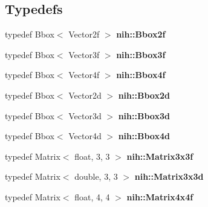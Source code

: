 \subsection*{\-Typedefs}
\begin{DoxyCompactItemize}
\item 
\hypertarget{group__linalg_ga5ebd3a6c3e9a5a8ac883e5a87bf821e6}{
typedef \-Bbox$<$ \-Vector2f $>$ {\bfseries nih\-::\-Bbox2f}}
\label{group__linalg_ga5ebd3a6c3e9a5a8ac883e5a87bf821e6}

\item 
\hypertarget{group__linalg_ga4454301371a3ef18876d4c33f9b15418}{
typedef \-Bbox$<$ \-Vector3f $>$ {\bfseries nih\-::\-Bbox3f}}
\label{group__linalg_ga4454301371a3ef18876d4c33f9b15418}

\item 
\hypertarget{group__linalg_ga276df7c674fca6914e123dcf4df166ed}{
typedef \-Bbox$<$ \-Vector4f $>$ {\bfseries nih\-::\-Bbox4f}}
\label{group__linalg_ga276df7c674fca6914e123dcf4df166ed}

\item 
\hypertarget{group__linalg_ga70a3a6e123309089469f924018908bae}{
typedef \-Bbox$<$ \-Vector2d $>$ {\bfseries nih\-::\-Bbox2d}}
\label{group__linalg_ga70a3a6e123309089469f924018908bae}

\item 
\hypertarget{group__linalg_ga073517d49cea29e74f704677e268f215}{
typedef \-Bbox$<$ \-Vector3d $>$ {\bfseries nih\-::\-Bbox3d}}
\label{group__linalg_ga073517d49cea29e74f704677e268f215}

\item 
\hypertarget{group__linalg_ga6079eb49bd961dbb56b17e1e657eb2dd}{
typedef \-Bbox$<$ \-Vector4d $>$ {\bfseries nih\-::\-Bbox4d}}
\label{group__linalg_ga6079eb49bd961dbb56b17e1e657eb2dd}

\item 
\hypertarget{group__linalg_ga068289888360ffe2e4c54644a89c3bde}{
typedef \-Matrix$<$ float, 3, 3 $>$ {\bfseries nih\-::\-Matrix3x3f}}
\label{group__linalg_ga068289888360ffe2e4c54644a89c3bde}

\item 
\hypertarget{group__linalg_gaa34814c8fbeebc00b3aacbbb9a802a0f}{
typedef \-Matrix$<$ double, 3, 3 $>$ {\bfseries nih\-::\-Matrix3x3d}}
\label{group__linalg_gaa34814c8fbeebc00b3aacbbb9a802a0f}

\item 
\hypertarget{group__linalg_gab91e326c8a8aefd74552fcf7453d9edf}{
typedef \-Matrix$<$ float, 4, 4 $>$ {\bfseries nih\-::\-Matrix4x4f}}
\label{group__linalg_gab91e326c8a8aefd74552fcf7453d9edf}


\end{DoxyCompactItemize}
